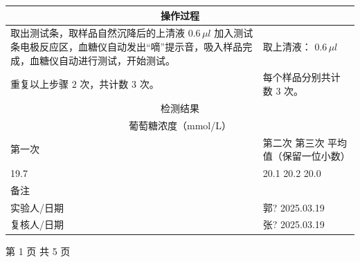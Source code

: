 \documentclass[UTF8,10pt,a4paper,fontset=fandol]{ctexart}
\newcommand{\fieldvalue}[1]{#1}
\newcommand{\handwritten}[1]{#1}
\begin{document}
\begin{center}
\begin{tabular}{|p{7.2cm}|p{6.8cm}|}
\hline
\multicolumn{2}{|c|}{操作过程} \\
\hline
取出测试条，取样品自然沉降后的上清液 $0.6\,\mu l$ 加入测试条电极反应区，血糖仪自动发出“嘀”提示音，吸入样品完成，血糖仪自动进行测试，开始测试。 &
取上清液：
\fieldvalue{\handwritten{0.6}}\,\ensuremath{\mu l}
\\
\hline
重复以上步骤 $2$ 次，共计数 $3$ 次。 &
每个样品分别共计数
\fieldvalue{\handwritten{3}} 次。 \\
\hline
\multicolumn{2}{|c|}{检测结果} \\
\hline
\multicolumn{2}{|c|}{葡萄糖浓度（mmol/L）} \\
\hline
第一次 & 第二次 \quad\quad 第三次 \quad\quad 平均值（保留一位小数） \\
\hline
\fieldvalue{\handwritten{19.7}} &
\fieldvalue{\handwritten{20.1}}
\quad\quad
\fieldvalue{\handwritten{20.2}}
\quad\quad
\fieldvalue{\handwritten{20.0}} \\
\hline
备注 &
\fieldvalue{\handwritten{\checkmark}} \\
\hline
实验人/日期 &
\fieldvalue{\handwritten{郭?}}
\quad
\fieldvalue{\handwritten{2025.03.19}} \\
\hline
复核人/日期 &
\fieldvalue{\handwritten{张?}}
\quad
\fieldvalue{\handwritten{2025.03.19}} \\
\hline
\end{tabular}
\end{center}

\begin{center}
第 1 页 共 5 页
\end{center}
\end{document}
